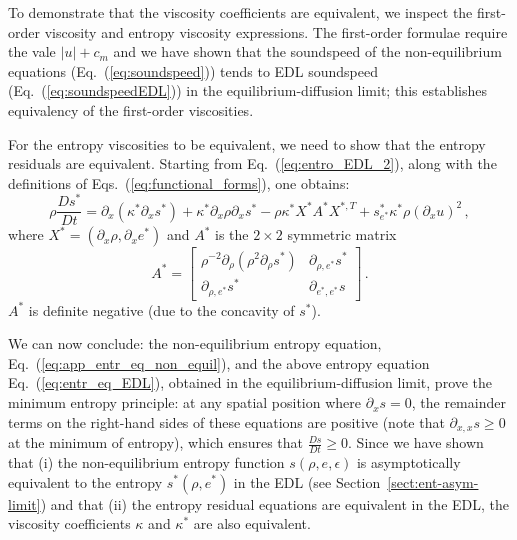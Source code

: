 \documentclass[review]{elsarticle}
\newcommand{\eqt}[1]{Eq.~(\ref{#1})}                     %
\newcommand{\eqts}[1]{Eqs.~(\ref{#1})}                     %
\newcommand{\sect}[1]{Section~\ref{#1}}                     %
\newcommand{\tcr}[1]{\textcolor{red}{#1}}
\newcommand{\matder}[1]{\frac{D #1}{Dt}}
\begin{document}
\begin{appendices}
To demonstrate that the viscosity coefficients are equivalent, we inspect the first-order viscosity and entropy viscosity expressions. The first-order formulae require the vale $|u| + c_m$ and we have shown that the soundspeed of the non-equilibrium equations (\eqt{eq:soundspeed}) tends to  EDL soundspeed (\eqt{eq:soundspeedEDL}) in the equilibrium-diffusion limit; this establishes equivalency of the first-order viscosities.

For the entropy viscosities to be equivalent, we need to show that the entropy residuals are equivalent. Starting from \eqt{eq:entro_EDL_2}, along with the definitions of \eqts{eq:functional_forms}, one obtains:
%
\begin{equation} \label{eq:entro_EDL_3}
\rho \matder {s^*}  
= \partial_x \left( \kappa^* \partial_x s^* \right) 
+
 \kappa^* \partial_x \rho \partial_x s^*
- \rho \kappa^* X^* A^* X^{*,T}
+ s^*_{e^*} \kappa^* \rho \left( \partial_x u \right)^2 
\, ,
\end{equation}
%
 where $X^*=\left( \partial_x \rho, \partial_x e^* \right)$ and $A^*$ is the $2 \times 2$ symmetric matrix
 \begin{equation} \label{eq:entr_eq_EDL}
 A^* = 
 \left[
 \begin{array}{cc}
 \rho^{-2}\partial_{\rho} \left( \rho^2 \partial_{\rho} s^* \right) & \partial_{\rho,e^*} s^* \\
 \partial_{\rho,e^*} s^*                                            & \partial_{e^*,e^*} s    
 \end{array}
 \right] \,.
 \end{equation}
$A^*$ is definite negative (due to the concavity of $s^*$). 
 
We can now conclude: the non-equilibrium entropy equation, \eqt{eq:app_entr_eq_non_equil}, and the above entropy equation \eqt{eq:entr_eq_EDL}, obtained in the equilibrium-diffusion limit, prove the minimum entropy principle: at any spatial position where $\partial_x s =0$, the remainder terms on the right-hand sides of these equations are positive (note that $\partial_{x,x} s \geq0$ at the minimum of entropy), which ensures that $\matder{s} \ge 0$. Since we have shown that (i) the non-equilibrium entropy function $s(\rho,e,\epsilon)$ is asymptotically equivalent to the entropy $s^*(\rho,e^*)$ in the EDL (see \sect{sect:ent-asym-limit}) and that (ii) the entropy residual equations are equivalent in the EDL, the viscosity coefficients $\kappa$ and $\kappa^*$ are also equivalent.
%

\end{appendices}
\end{document}
